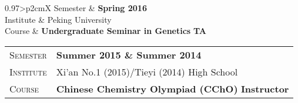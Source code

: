 \documentclass[letterpaper, oneside, final]{scrartcl} %
\begin{document}
\begin{center}
\begin{tabularx}{0.97\linewidth}{>{\raggedleft\scshape}p{2cm}X}
	Semester & \textbf{Spring 2016}\\
	Institute & Peking University\\
	Course & \textbf{Undergraduate Seminar in Genetics} \hfill \textbf{TA}\\
\end{tabularx}
\vspace{12pt}


\begin{tabularx}{0.97\linewidth}{>{\raggedleft\scshape}p{2cm}X}
	Semester & \textbf{Summer 2015 \& Summer 2014}\\
	Institute & Xi'an No.1 (2015)/Tieyi (2014) High School\\
	Course & \textbf{Chinese Chemistry Olympiad (CChO)} \hfill \textbf{Instructor}\\
\end{tabularx}
\vspace{12pt}



\end{center}
\end{document}
